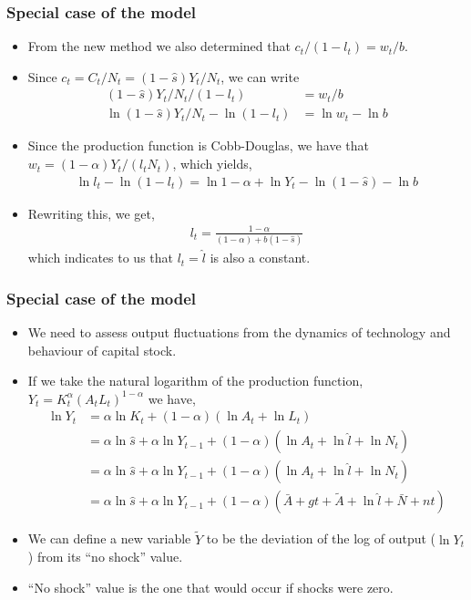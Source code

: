 \documentclass[10pt, handout]{beamer} %
\begin{document}
\begin{frame}
\frametitle{Special case of the model}
\begin{itemize}[<+->]
\item From the new method we also determined that $c_{t}/(1-l_{t}) = w_{t}/b$.
\item Since $c_{t} = C_{t}/N_{t} = (1 - \hat{s})Y_{t}/N_{t}$, we can write
\begin{align*}
(1 - \hat{s})Y_{t}/N_{t}/(1-l_{t}) &= w_{t}/b \\
\ln(1 - \hat{s})Y_{t}/N_{t} - \ln(1-l_{t}) &= \ln{w_{t}} - \ln{b}
\end{align*}
\item Since the production function is Cobb-Douglas, we have that $w_{t} = (1-\alpha)Y_{t}/(l_{t}N_{t})$, which yields,
\begin{align*}
\ln{l}_{t} - \ln(1-l_{t})
= \ln{1-\alpha} + \ln{Y}_{t} - \ln(1 - \hat{s}) - \ln{b}
\end{align*}
\item Rewriting this, we get,
\begin{align*}
l_{t} = \frac{1-\alpha}{(1-\alpha) + b(1-\hat{s})}
\end{align*}
which indicates to us that $l_{t} = \hat{l}$ is also a constant.
\end{itemize}
\end{frame}


\begin{frame}
\frametitle{Special case of the model}
\begin{itemize}[<+->]
\item We need to assess output fluctuations from the dynamics of technology and behaviour of capital stock.
\item If we take the natural logarithm of the production function, $Y_{t} = K_{t}^{\alpha}(A_{t}L_{t})^{1-\alpha}$ we have,
\begin{align*}
\ln{Y_{t}} &= \alpha\ln{K_{t}} + (1-\alpha)(\ln{A_{t}} + \ln{L_{t}}) \\
 &= \alpha\ln{\hat{s}} + \alpha\ln{Y_{t-1}} + (1-\alpha)(\ln{A_{t}} + \ln{\hat{l}} +  \ln{N_{t}}) \\
 &= \alpha\ln{\hat{s}} + \alpha\ln{Y_{t-1}} + (1-\alpha)(\ln{A_{t}} + \ln{\hat{l}} +  \ln{N_{t}}) \\
 &= \alpha\ln{\hat{s}} + \alpha\ln{Y_{t-1}} + (1-\alpha)(\bar{A} + gt + \tilde{A} + \ln{\hat{l}} +  \bar{N} + nt)
\end{align*}
\item We can define a new variable $\tilde{Y}$ to be the deviation of the log of output ($\ln{Y_{t}}$) from its ``no shock'' value.
\item ``No shock'' value is the one that would occur if shocks were zero.
\end{itemize}
\end{frame}
\end{document}
